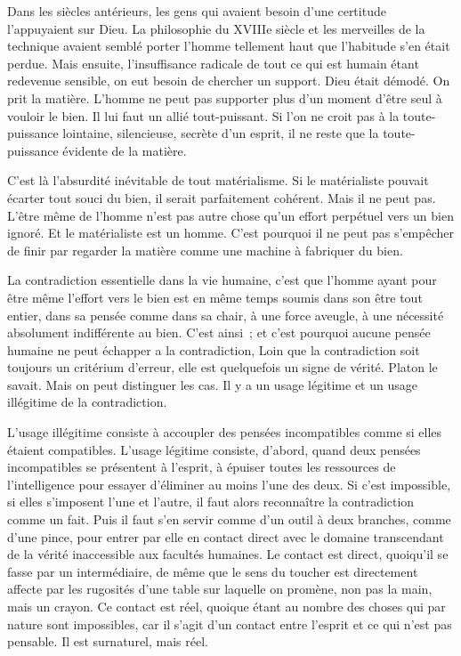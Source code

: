 \documentclass[french,twoside]{book} %
\begin{document}
Dans les siècles antérieurs, les gens qui avaient besoin d'une certitude l'appuyaient sur Dieu. La philosophie du XVIIIe siècle et les merveilles de la technique avaient semblé porter l'homme tellement haut que l'habitude s'en était perdue. Mais ensuite, l'insuffisance radicale de tout ce qui est humain étant redevenue sensible, on eut besoin de chercher un support. Dieu était démodé. On prit la matière. L'homme ne peut pas supporter plus d'un moment d'être seul à vouloir le bien. Il lui faut un allié tout-puissant. Si l'on ne croit pas à la toute-puissance lointaine, silencieuse, secrète d’un esprit, il ne reste que la toute-puissance évidente de la matière.\par
C'est là l'absurdité inévitable de tout matérialisme. Si le matérialiste pouvait écarter tout souci du bien, il serait parfaitement cohérent. Mais il ne peut pas. L'être même de l'homme n'est pas autre chose qu'un effort perpétuel vers un bien ignoré. Et le matérialiste est un homme. C'est pourquoi il ne peut pas s'empêcher de finir par regarder la matière comme une machine à fabriquer du bien.\par
La contradiction essentielle dans la vie humaine, c'est que l'homme ayant pour être même l'effort vers le bien est en même temps soumis dans son être tout entier, dans sa pensée comme dans sa chair, à une force aveugle, à une nécessité absolument indifférente au bien. C'est ainsi ; et c'est pourquoi aucune pensée humaine ne peut échapper a la contradiction, Loin que la contradiction soit toujours un critérium d'erreur, elle est quelquefois un signe de vérité. Platon le savait. Mais on peut distinguer les cas. Il y a un usage légitime et un usage illégitime de la contradiction.\par
L'usage illégitime consiste à accoupler des pensées incompatibles comme si elles étaient compatibles. L'usage légitime consiste, d'abord, quand deux pensées incompatibles se présentent à l'esprit, à épuiser toutes les ressources de l'intelligence pour essayer d'éliminer au moins l'une des deux. Si c'est impossible, si elles s'imposent l'une et l'autre, il faut alors reconnaître la contradiction comme un fait. Puis il faut s'en servir comme d'un outil à deux branches, comme d'une pince, pour entrer par elle en contact direct avec le domaine transcendant de la vérité inaccessible aux facultés humaines. Le contact est direct, quoiqu'il se fasse par un intermédiaire, de même que le sens du toucher est directement affecte par les rugosités d'une table sur laquelle on promène, non pas la main, mais un crayon. Ce contact est réel, quoique étant au nombre des choses qui par nature sont impossibles, car il s'agit d'un contact entre l'esprit et ce qui n'est pas pensable. Il est surnaturel, mais réel.\par
\end{document}

